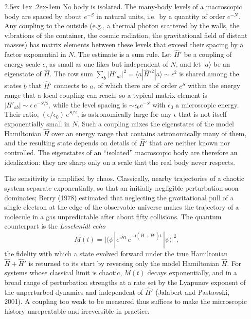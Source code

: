 \documentclass[10pt,a4paper]{article}
\makeatletter
\renewcommand{\paragraph}{\@startsection{paragraph}{4}{\z@}%
  {2.5ex \@plus 1ex \@minus .2ex}{-1em}%
  {\normalfont\fontsize{14pt}{17pt}\selectfont\bfseries}}
\newcommand{\ii}{\mathrm{i}}
\makeatother
\begin{document}
\paragraph{No body is isolated.}
The many-body levels of a macroscopic body are spaced by about $ e^{-S} $ in natural units, i.e.\ by a quantity of order $ e^{-N} $.
Any coupling to the outside (e.g., a thermal photon scattered by the walls, the vibrations of the container, the cosmic radiation, the gravitational field of distant masses) has matrix elements between these levels that exceed their spacing by a factor exponential in $ N $.
The estimate is a sum rule.
Let $ \hat H' $ be a coupling of energy scale $ \epsilon $, as small as one likes but independent of $ N $, and let $ |a\rangle $ be an eigenstate of $ \hat H $.
The row sum $ \sum_b|H'_{ab}|^{2} = \langle a|\hat H'^{2}|a\rangle \sim \epsilon^{2} $ is shared among the states $ b $ that $ \hat H' $ connects to $ a $, of which there are of order $ e^{S} $ within the energy range that a local coupling can reach, so a typical matrix element is $ |H'_{ab}| \sim \epsilon\,e^{-S/2} $, while the level spacing is $ \sim \epsilon_0 e^{-S} $ with $ \epsilon_0 $ a microscopic energy.
Their ratio, $ (\epsilon/\epsilon_0)\,e^{S/2} $, is astronomically large for any $ \epsilon $ that is not itself exponentially small in $ N $.
Such a coupling mixes the eigenstates of the model Hamiltonian $ \hat H $ over an energy range that contains astronomically many of them, and the resulting state depends on details of $ \hat H' $ that are neither known nor controlled.
The eigenstates of an ``isolated'' macroscopic body are therefore an idealization: they are sharp only on a scale that the real body never respects.

The sensitivity is amplified by chaos.
Classically, nearby trajectories of a chaotic system separate exponentially, so that an initially negligible perturbation soon dominates; Berry (1978) estimated that neglecting the gravitational pull of a single electron at the edge of the observable universe makes the trajectory of a molecule in a gas unpredictable after about fifty collisions.
The quantum counterpart is the \emph{Loschmidt echo}
\[
  M(t) = \big|\langle\psi|\,e^{\ii \hat Ht}\,e^{-\ii (\hat H + \hat H')t}\,|\psi\rangle\big|^{2} ,
\]
the fidelity with which a state evolved forward under the true Hamiltonian $ \hat H + \hat H' $ is returned to its start by reversing only the model Hamiltonian $ \hat H $.
For systems whose classical limit is chaotic, $ M(t) $ decays exponentially, and in a broad range of perturbation strengths at a rate set by the Lyapunov exponent of the unperturbed dynamics and independent of $ \hat H' $ (Jalabert and Pastawski, 2001).
A coupling too weak to be measured thus suffices to make the microscopic history unrepeatable and irreversible in practice.
\end{document}
